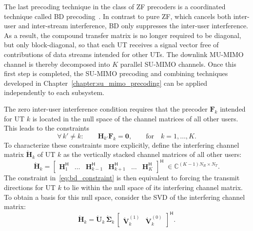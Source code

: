 The last precoding technique in the class of \ac{ZF} precoders is a coordinated technique called \acf{BD} precoding~\cite{BD_precoding_0}.
In contrast to pure \ac{ZF}, which cancels both inter-user and inter-stream interference, \ac{BD} only suppresses the inter-user interference.
As a result, the compound transfer matrix is no longer required to be diagonal, but only block-diagonal, so that each \ac{UT} receives a signal vector free of contributions of data streams intended for other \acp{UT}.
The downlink \ac{MU}-\ac{MIMO} channel is thereby decomposed into $K$ parallel \ac{SU}-\ac{MIMO} channels.
Once this first step is completed, the \ac{SU}-\ac{MIMO} precoding and combining techniques developed in Chapter~\ref{chapter:su_mimo_precoding} can be applied independently to each subsystem.

The zero inter-user interference condition requires that the precoder $\mathbf{F}_k$ intended for \ac{UT} $k$ is located in the null space of the channel matrices of all other users.
This leads to the constraints
\begin{equation}
\label{eq:bd_constraint}
    \forall \, k' \neq k : \qquad \mathbf{H}_{k'} \mathbf{F}_k = \mathbf{0}, \qquad \text{for} \quad k = 1, \dots, K.
\end{equation}
To characterize these constraints more explicitly, define the interfering channel matrix $\mathring{\mathbf{H}}_k$ of \ac{UT} $k$ as the vertically stacked channel matrices of all other users:
\begin{equation}
\label{eq:interfering_channel_matrix}
    \mathring{\mathbf{H}}_k = \begin{bmatrix} \mathbf{H}_1^{\mathsf{H}} & \dots & \mathbf{H}_{k-1}^{\mathsf{H}} & \mathbf{H}_{k+1}^{\mathsf{H}} & \dots & \mathbf{H}_K^{\mathsf{H}} \end{bmatrix}^{\mathsf{H}} \; \in \mathbb{C}^{(K-1)N_R \times N_T}.
\end{equation}
The constraint in~\eqref{eq:bd_constraint} is then equivalent to forcing the transmit directions for \ac{UT} $k$ to lie within the null space of its interfering channel matrix.\\
To obtain a basis for this null space, consider the \ac{SVD} of the interfering channel matrix:
\begin{equation}
\label{eq:svd_interfering_channel_matrix}
    \mathring{\mathbf{H}}_k = \mathring{\mathbf{U}}_k \, \mathring{\boldsymbol{\Sigma}}_k \, \begin{bmatrix} \mathring{\mathbf{V}}_{k}^{(1)} & \mathring{\mathbf{V}}_{k}^{(0)} \end{bmatrix}^{\mathsf{H}}.
\end{equation}
